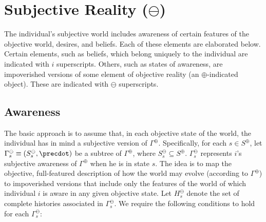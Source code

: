 \documentclass[
11pt,
titlepage,
reqno,
]{article}%
\theoremstyle{definition}
\begin{document}
\section{Subjective Reality ($\ominus$)}
The individual's subjective world includes awareness of certain features of the objective world, desires, and beliefs. 
Each of these elements are elaborated below. 
Certain elements, such as beliefs, which belong uniquely to the individual are indicated with $i$ superscripts.
Others, such as states of awareness, are impoverished versions of some element of objective reality (an $\oplus$-indicated object). 
These are indicated with $\ominus$ superscripts.

\subsection{Awareness}
The basic approach is to assume that, in each objective state of the world, the individual has in mind a subjective version of $\Gamma^\oplus$. 
Specifically, for each $s\in S^\oplus$, let $\Gamma^\ominus_s\equiv(S^\ominus_s,\precdot)$ be a subtree of $\Gamma^\oplus$, where $S^\ominus_s\subseteq S^\oplus$.
$\Gamma^\ominus_s$ represents $i$'s subjective awareness of $\Gamma^\oplus$ when he is in state $s$.
The idea is to map the objective, full-featured description of how the world may evolve (according to $\Gamma^\oplus$) to impoverished versions that include only the features of the world of which individual $i$ is aware in any given objective state.
Let $H^\ominus_s$ denote the set of complete histories associated in $\Gamma^\ominus_s$. 
We require the following conditions to hold for each $\Gamma^\ominus_s$:
\end{document}
